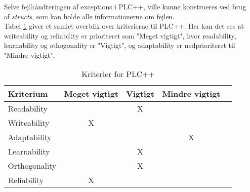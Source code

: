 Selve fejlhåndteringen af exceptions i PLC++, ville kunne konstrueres ved brug af \textit{structs}, som kan holde alle informationerne om fejlen. \\

\noindent Tabel \ref{table:kriterier} giver et samlet overblik over kriterierne til PLC++. Her kan det ses at writeability og reliability er prioriteret som "Meget vigtigt", hvor readability, learnability og othogonality er "Vigtigt", og adaptability er nedprioriteret til "Mindre vigtigt".

\begin{table}[H]
\centering
\begin{tabular}{l c c c c}
\toprule
\textbf{Kriterium} & \textbf{Meget vigtigt} & \textbf{Vigtigt} & \textbf{Mindre vigtigt}  \\ \midrule
Readability        &   & X &       \\ 
Writeability       & X &   &       \\ 
Adaptability       &   &   & X     \\ 
Learnability       &   & X &       \\ 
Orthogonality      &   & X &       \\ 
Reliability        & X &   &       \\ \bottomrule
\end{tabular}
\caption{Kriterier for PLC++}
\label{table:kriterier}
\end{table}






